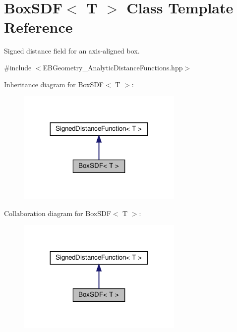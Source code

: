 \hypertarget{classBoxSDF}{}\section{Box\+S\+DF$<$ T $>$ Class Template Reference}
\label{classBoxSDF}


Signed distance field for an axis-\/aligned box.  




{\ttfamily \#include $<$E\+B\+Geometry\+\_\+\+Analytic\+Distance\+Functions.\+hpp$>$}



Inheritance diagram for Box\+S\+DF$<$ T $>$\+:\nopagebreak
\begin{figure}[H]
\begin{center}
\leavevmode
\includegraphics[width=227pt]{classBoxSDF__inherit__graph}
\end{center}
\end{figure}


Collaboration diagram for Box\+S\+DF$<$ T $>$\+:\nopagebreak
\begin{figure}[H]
\begin{center}
\leavevmode
\includegraphics[width=227pt]{classBoxSDF__coll__graph}
\end{center}
\end{figure}

